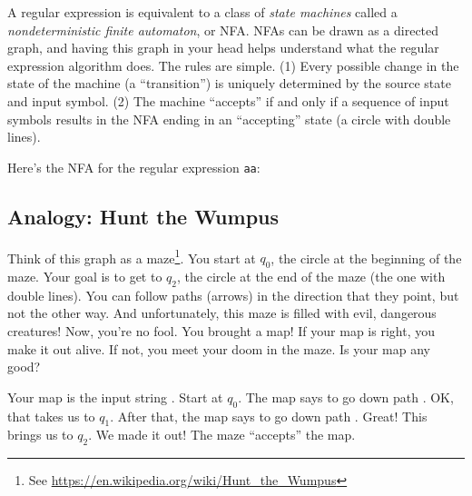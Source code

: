 \documentclass[9pt]{extbook}
\begin{document}
A regular expression is equivalent to a class of \emph{state machines} called a \emph{nondeterministic finite automaton}, or NFA.  NFAs can be drawn as a directed graph, and having this graph in your head helps understand what the regular expression algorithm does.  The rules are simple.  (1) Every possible change in the state of the machine (a ``transition'') is uniquely determined by the source state and input symbol.  (2) The machine ``accepts'' if and only if a sequence of input symbols results in the NFA ending in an ``accepting'' state (a circle with double lines).

Here's the NFA for the regular expression \texttt{aa}:

\begin{center}
\end{center}

\subsection{Analogy: Hunt the Wumpus}

Think of this graph as a maze\footnote{See \url{https://en.wikipedia.org/wiki/Hunt_the_Wumpus}}.  You start at $q_0$, the circle at the beginning of the maze.  Your goal is to get to $q_2$, the circle at the end of the maze (the one with double lines).  You can follow paths (arrows) in the direction that they point, but not the other way.  And unfortunately, this maze is filled with evil, dangerous creatures!  Now, you're no fool.  You brought a map!  If your map is right, you make it out alive.  If not, you meet your doom in the maze.  Is your map any good?

Your map is the input string .  Start at $q_0$.  The map says to go down path .  OK, that takes us to $q_1$.  After that, the map says to go down path .  Great!  This brings us to $q_2$.  We made it out!  The maze ``accepts'' the map.
\end{document}
